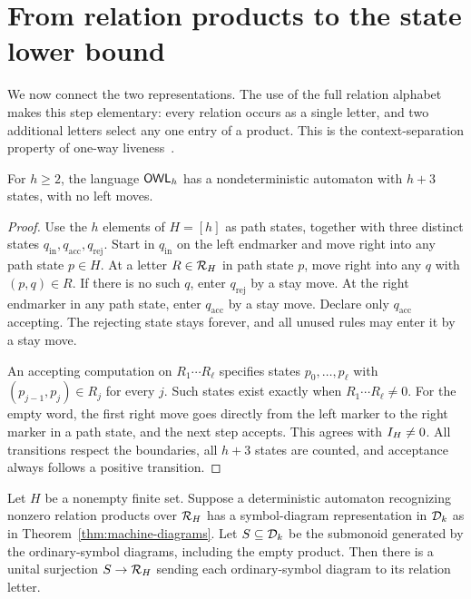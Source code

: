 \section{From relation products to the state lower bound}
\label{sec:separation}

We now connect the two representations. The use of the full relation
alphabet makes this step elementary: every relation occurs as a single
letter, and two additional letters select any one entry of a product.
This is the context-separation property of one-way
liveness~\cite{AdeogunKapoutsis2026}.

\begin{proposition}
\label{prop:small-nfa}
For $h\ge2$, the language $\mathsf{OWL}_h$ has a nondeterministic automaton with
$h+3$ states, with no left moves.
\end{proposition}

\begin{proof}
Use the $h$ elements of $H=[h]$ as path states, together with three distinct
states $q_{\mathrm{in}},q_{\mathrm{acc}},q_{\mathrm{rej}}$. Start in
$q_{\mathrm{in}}$ on the left endmarker and move right into any path state
$p\in H$. At a letter $R\in\mathcal R_{H}$ in path state $p$, move right into any
$q$ with $(p,q)\in R$. If there is no such $q$, enter
$q_{\mathrm{rej}}$ by a stay move. At the right endmarker in any path
state, enter $q_{\mathrm{acc}}$ by a stay move. Declare only
$q_{\mathrm{acc}}$ accepting. The rejecting state stays forever, and all
unused rules may enter it by a stay move.

An accepting computation on $R_1\cdots R_\ell$ specifies states
$p_0,\ldots,p_\ell$ with $(p_{j-1},p_j)\in R_j$ for every $j$.
Such states exist exactly when $R_1\cdots R_\ell\ne0$.
For the empty word, the first right move goes directly from the left
marker to the right marker in a path state, and the next step accepts.
This agrees with $I_{H}\ne0$. All transitions respect the boundaries,
all $h+3$ states are counted, and acceptance always follows a positive
transition.
\end{proof}

\begin{lemma}
\label{lem:syntactic-quotient}
Let $H$ be a nonempty finite set. Suppose a deterministic automaton
recognizing nonzero relation products over $\mathcal R_{H}$ has a symbol-diagram
representation in $\mathcal D_{k}$ as in Theorem~\ref{thm:machine-diagrams}.
Let $S\subseteq\mathcal D_{k}$ be the submonoid generated by the ordinary-symbol
diagrams, including the empty product. Then there is a unital surjection
$S\to\mathcal R_{H}$ sending each ordinary-symbol diagram to its relation letter.
\end{lemma}

